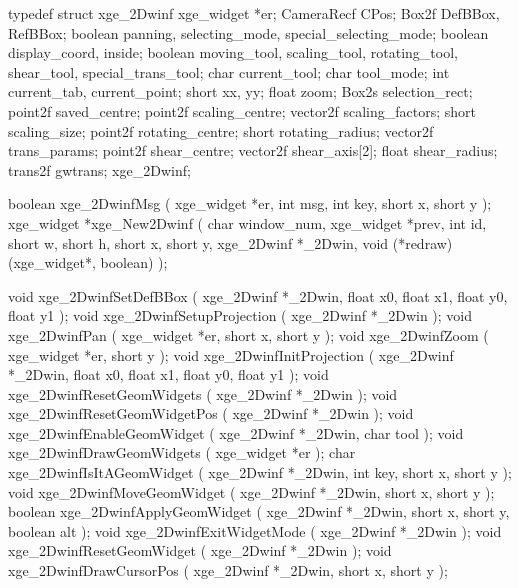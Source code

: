 \begin{listingC}
typedef struct xge_2Dwinf {
    xge_widget  *er;
    CameraRecf  CPos;
    Box2f       DefBBox, RefBBox;
    boolean     panning, selecting_mode, special_selecting_mode;
    boolean     display_coord, inside;
    boolean     moving_tool, scaling_tool, rotating_tool, shear_tool,
                special_trans_tool;
    char        current_tool;
    char        tool_mode;
    int         current_tab, current_point;
    short       xx, yy;
    float       zoom;
    Box2s       selection_rect;
    point2f     saved_centre;
    point2f     scaling_centre;
    vector2f    scaling_factors;
    short       scaling_size;
    point2f     rotating_centre;
    short       rotating_radius;
    vector2f    trans_params;
    point2f     shear_centre;
    vector2f    shear_axis[2];
    float       shear_radius;
    trans2f     gwtrans;
  } xge_2Dwinf;
\end{listingC}

\begin{listingC}
boolean xge_2DwinfMsg ( xge_widget *er,
                        int msg, int key, short x, short y );
xge_widget *xge_New2Dwinf ( char window_num, xge_widget *prev,
                            int id,
                            short w, short h, short x, short y,
                            xge_2Dwinf *_2Dwin,
                            void (*redraw)(xge_widget*, boolean) );
\end{listingC}

\begin{listingC}
void xge_2DwinfSetDefBBox ( xge_2Dwinf *_2Dwin,
                            float x0, float x1, float y0, float y1 );
void xge_2DwinfSetupProjection ( xge_2Dwinf *_2Dwin );
void xge_2DwinfPan ( xge_widget *er, short x, short y );
void xge_2DwinfZoom ( xge_widget *er, short y );
void xge_2DwinfInitProjection ( xge_2Dwinf *_2Dwin,
                            float x0, float x1, float y0, float y1 );
void xge_2DwinfResetGeomWidgets ( xge_2Dwinf *_2Dwin );
void xge_2DwinfResetGeomWidgetPos ( xge_2Dwinf *_2Dwin );
void xge_2DwinfEnableGeomWidget ( xge_2Dwinf *_2Dwin, char tool );
void xge_2DwinfDrawGeomWidgets ( xge_widget *er );
char xge_2DwinfIsItAGeomWidget ( xge_2Dwinf *_2Dwin,
                                 int key, short x, short y );
void xge_2DwinfMoveGeomWidget ( xge_2Dwinf *_2Dwin,
                                short x, short y );
boolean xge_2DwinfApplyGeomWidget ( xge_2Dwinf *_2Dwin,
                                    short x, short y, boolean alt );
void xge_2DwinfExitWidgetMode ( xge_2Dwinf *_2Dwin );
void xge_2DwinfResetGeomWidget ( xge_2Dwinf *_2Dwin );
void xge_2DwinfDrawCursorPos ( xge_2Dwinf *_2Dwin,
                               short x, short y );
\end{listingC}


